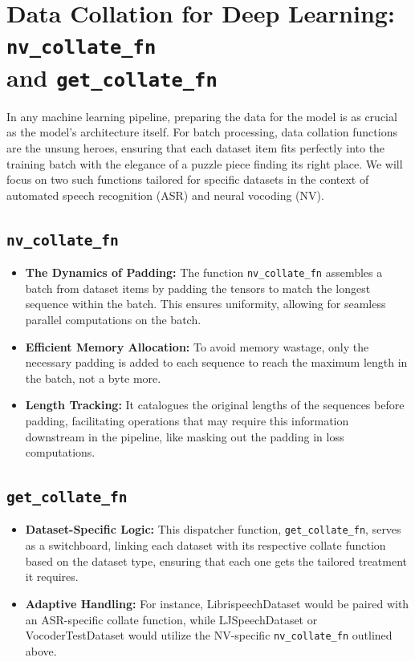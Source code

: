 \documentclass[a4paper]{article}
\begin{document}
\section{Data Collation for Deep Learning: \texttt{nv\_collate\_fn}\\ and \texttt{get\_collate\_fn}}

In any machine learning pipeline, preparing the data for the model is as crucial as the model's architecture itself. For batch processing, data collation functions are the unsung heroes, ensuring that each dataset item fits perfectly into the training batch with the elegance of a puzzle piece finding its right place. We will focus on two such functions tailored for specific datasets in the context of automated speech recognition (ASR) and neural vocoding (NV).

\subsection{\texttt{nv\_collate\_fn}}

\begin{itemize}
  \item \textbf{The Dynamics of Padding:} The function \texttt{nv\_collate\_fn} assembles a batch from dataset items by padding the tensors to match the longest sequence within the batch. This ensures uniformity, allowing for seamless parallel computations on the batch.

  \item \textbf{Efficient Memory Allocation:} To avoid memory wastage, only the necessary padding is added to each sequence to reach the maximum length in the batch, not a byte more.

  \item \textbf{Length Tracking:} It catalogues the original lengths of the sequences before padding, facilitating operations that may require this information downstream in the pipeline, like masking out the padding in loss computations.
\end{itemize}

\subsection{\texttt{get\_collate\_fn}}

\begin{itemize}
  \item \textbf{Dataset-Specific Logic:} This dispatcher function, \texttt{get\_collate\_fn}, serves as a switchboard, linking each dataset with its respective collate function based on the dataset type, ensuring that each one gets the tailored treatment it requires.
  
  \item \textbf{Adaptive Handling:} For instance, LibrispeechDataset would be paired with an ASR-specific collate function, while LJSpeechDataset or VocoderTestDataset would utilize the NV-specific \texttt{nv\_collate\_fn} outlined above.
\end{itemize}
\end{document}
